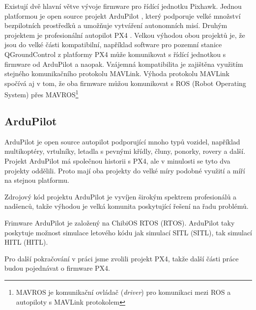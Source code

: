 Existují dvě hlavní větve vývoje firmware pro řídící jednotku Pixhawk. Jednou platformou je open source projekt ArduPilot \cite{ARDU}, který podporuje velké množství bezpilotních prostředků a umožňuje vytváření autonomních misí. Druhým projektem je profesionální autopilot PX4 \cite{PX4ORG}. Velkou výhodou obou projektů je, že jsou do velké části kompatibilní, například software pro pozemní stanice QGroundControl z platformy PX4 může komunikovat s řídící jednotkou s firmware od ArduPilot a naopak. Vzájemná kompatibilita je zajištěna využitím stejného komunikačního protokolu MAVLink. Výhoda protokolu MAVLink spočívá aj v tom, že oba firmware můžou komunikovat s ROS (Robot Operating System) přes MAVROS\footnote{MAVROS je komunikační ovládač (\textit{driver}) pro komunikaci mezi ROS a autopiloty s MAVLink protokolem}

\subsection{ArduPilot}

ArduPilot je open source autopilot podporující mnoho typů vozidel, například multikoptéry, vrtulníky, letadla s pevnými křídly, čluny, ponorky, rovery a další. Projekt ArduPilot má společnou historii s PX4, ale v minulosti se tyto dva projekty oddělili. Proto mají oba projekty do velké míry podobné využití a míří na stejnou platformu.

Zdrojový kód projektu ArduPilot je vyvíjen širokým spektrem profesionálů a nadšenců, takže výhodou je velká komunita poskytující řešení na řadu problémů.

Frimware ArduPilot je založený na ChibiOS \acs{RTOS} (\acl{RTOS}). ArduPilot taky poskytuje možnost simulace letového kódu jak simulací \acs{SITL} (\acl{SITL}), tak simulací \acs{HITL} (\acl{HITL}). \cite{ARDU}

Pro další pokračování v práci jsme zvolili projekt PX4, takže další části práce budou pojednávat o firmware PX4.

